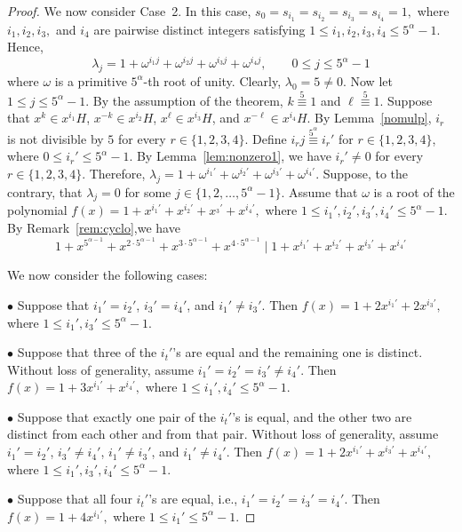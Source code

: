 \documentclass[12pt]{article}
\begin{document}
\begin{proof}
We now consider Case~2. In this case,
$
s_0=
s_{i_1}=s_{i_2}=s_{i_3}=s_{i_4}=1,$
where \(i_1,i_2,i_3,\) and \(i_4\) are pairwise distinct integers satisfying
$
1\le i_1,i_2,i_3,i_4\le 5^{\alpha}-1.
$
Hence,
\[
\lambda_j
=
1+\omega^{i_1j}+\omega^{i_2j}+\omega^{i_3j}+\omega^{i_4j}, \qquad
0\le j\le 5^{\alpha}-1
\]
where $\omega$ is a primitive $5^{\alpha}$-th root of unity. Clearly,
$\lambda_0=5\neq0.$ Now let \(1\le j\le 5^\alpha-1\). By the assumption of the theorem, $k\stackrel{5}{\equiv}1$ and $\ell\stackrel{5}{\equiv}1$. Suppose that $x^k\in x^{i_1}H$, $x^{-k}\in x^{i_2}H$, $x^\ell\in x^{i_3}H$, and $x^{-\ell}\in x^{i_4}H$. By Lemma~\ref{nomulp}, $i_r$ is not divisible by $5$ for every $r\in\{1,2,3,4\}$. 	Define $i_rj\stackrel{5^\alpha}{\equiv}i_r'$ for $r\in\{1,2,3,4\}$, where $0\le i_r'\le 5^\alpha-1$. By Lemma~\ref{lem:nonzero1}, we have $i_r'\neq 0$ for every $r\in\{1,2,3,4\}$. Therefore, $\lambda_j=1+\omega^{i_1'}+\omega^{i_2'}+\omega^{i_3'}+\omega^{i_4'}$.	
Suppose, to the contrary, that $\lambda_j=0$ for some
$
j\in\{1,2,\ldots,5^\alpha-1\}.
$
Assume that $\omega$ is a root of the polynomial
$
f(x)=1+x^{i_1'}+x^{i_2'}+x^{_3'}+x^{i_4'},
$
where
$
1\le i_1',i_2',i_3',i_4'\le 5^\alpha-1.
$ By Remark~\ref{rem:cyclo},we have
\[
1+x^{5^{\alpha-1}}+x^{2\cdot5^{\alpha-1}}+x^{3\cdot5^{\alpha-1}}+x^{4\cdot5^{\alpha-1}}
\mid
1+x^{i_1'}+x^{i_2'}+x^{i_3'}+x^{i_4'}
\]

We now consider the following cases:

$\bullet$
Suppose that $i_1'=i_2'$, $i_3'=i_4'$, and $i_1'\neq i_3'$. Then
$
f(x)=1+2x^{i_1'}+2x^{i_3'},
$
where $1\le i_1',i_3'\le 5^\alpha-1$.

\medskip

$\bullet$
Suppose that three of the $i_t'$'s are equal and the remaining one is distinct. Without loss of generality, assume $i_1'=i_2'=i_3'\neq i_4'$. Then
$
f(x)=1+3x^{i_1'}+x^{i_4'},
$
where $1\le i_1',i_4'\le 5^\alpha-1$.

\medskip

$\bullet$
Suppose that exactly one pair of the $i_t'$'s is equal, and the other two are distinct from each other and from that pair. Without loss of generality, assume $i_1'=i_2'$, $i_3'\neq i_4'$, $i_1'\neq i_3'$, and $i_1'\neq i_4'$. Then
$
f(x)=1+2x^{i_1'}+x^{i_3'}+x^{i_4'},
$
where $1\le i_1',i_3',i_4'\le 5^\alpha-1$.

\medskip

$\bullet$
Suppose that all four $i_t'$'s are equal, i.e., $i_1'=i_2'=i_3'=i_4'$. Then
$
f(x)=1+4x^{i_1'},
$
where $1\le i_1'\le 5^\alpha-1$.


\end{proof}
\end{document}
